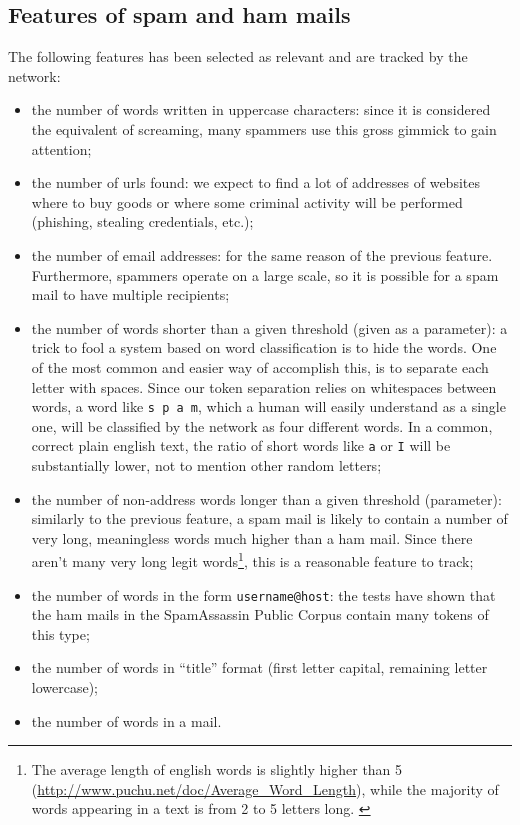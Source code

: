 \subsection{Features of spam and ham mails}
The following features has been selected as relevant and are tracked by the network:
\begin{itemize}[noitemsep]
  \item the number of words written in uppercase characters: since it is considered the equivalent of screaming, many spammers use this gross gimmick to gain attention;
  \item the number of urls found: we expect to find a lot of addresses of websites where to buy goods or where some criminal activity will be performed (phishing, stealing credentials, etc.);
  \item the number of email addresses: for the same reason of the previous feature. Furthermore, spammers operate on a large scale, so it is possible for a spam mail to have multiple recipients;
  \item the number of words shorter than a given threshold (given as a parameter): a trick to fool a system based on word classification is to hide the words. One of the most common and easier way of accomplish this, is to separate each letter with spaces. Since our token separation relies on whitespaces between words, a word like \verb!s p a m!, which a human will easily understand as a single one, will be classified by the network as four different words. In a common, correct plain english text, the ratio of short words like \verb!a! or \verb!I! will be substantially lower, not to mention other random letters;
  \item the number of non-address words longer than a given threshold (parameter): similarly to the previous feature, a spam mail is likely to contain a number of very long, meaningless words much higher than a ham mail. Since there aren't many very long legit words\footnote{The average length of english words is slightly higher than 5 (\url{http://www.puchu.net/doc/Average_Word_Length}), while the majority of words appearing in a text is from 2 to 5 letters long. \citep{STUL:STUL109}}, this is a reasonable feature to track;
  \item the number of words in the form \verb!username@host!: the tests have shown that the ham mails in the SpamAssassin Public Corpus contain many tokens of this type;
  \item the number of words in ``title'' format (first letter capital, remaining letter lowercase);
  \item the number of words in a mail.
\end{itemize}

